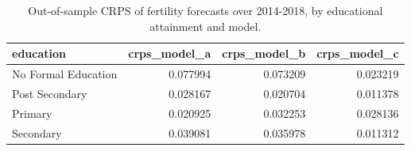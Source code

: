 \begin{table}[ht]
\centering
\begin{tabular}{lrrr}
\hline
education & crps_model_a & crps_model_b & crps_model_c \\
\hline
No Formal Education & 0.077994 & 0.073209 & 0.023219 \\
Post Secondary & 0.028167 & 0.020704 & 0.011378 \\
Primary & 0.020925 & 0.032253 & 0.028136 \\
Secondary & 0.039081 & 0.035978 & 0.011312 \\
\hline
\end{tabular}
\caption{Out-of-sample CRPS of fertility forecasts over 2014-2018, by educational attainment and model.}
\label{tab:new_table_e8}
\end{table}
